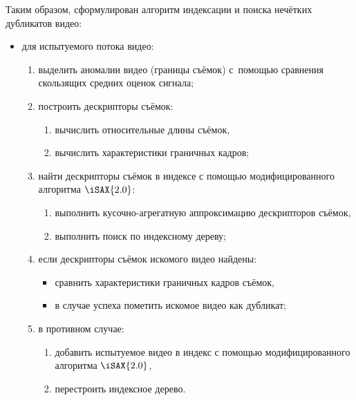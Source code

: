 \documentclass{.local/lib/classes/ndvr-super-article-standalone}
\begin{document}
    Таким образом, сформулирован алгоритм индексации и поиска
    нечётких дубликатов видео:
    \begin{itemize}
        \item для испытуемого потока видео:
        \begin{enumerate}
            \item выделить аномалии видео (границы съёмок) 
                с~помощью сравнения скользящих 
                средних оценок сигнала;
            \item построить дескрипторы съёмок:
            \begin{enumerate}
                \item вычислить относительные длины съёмок,
                \item вычислить характеристики граничных кадров;
            \end{enumerate}
            \item найти дескрипторы съёмок в индексе
                  с помощью модифицированного алгоритма $\iSAX{2.0}$:
            \begin{enumerate}
                \item выполнить кусочно-агрегатную аппроксимацию
                      дескрипторов съёмок,
                \item выполнить поиск по индексному дереву;
            \end{enumerate}
            \item если дескрипторы съёмок искомого видео найдены:
            \begin{itemize}
                \item сравнить характеристики 
                      граничных кадров съёмок,
                \item в случае успеха 
                      пометить искомое видео как дубликат;
            \end{itemize}
            \item в противном случае: 
            \begin{enumerate}
                \item добавить испытуемое видео 
                    в индекс с помощью модифицированного 
                    алгоритма $\iSAX{2.0}$,
                \item перестроить индексное дерево.
            \end{enumerate}
        \end{enumerate}
    \end{itemize}
\end{document}
